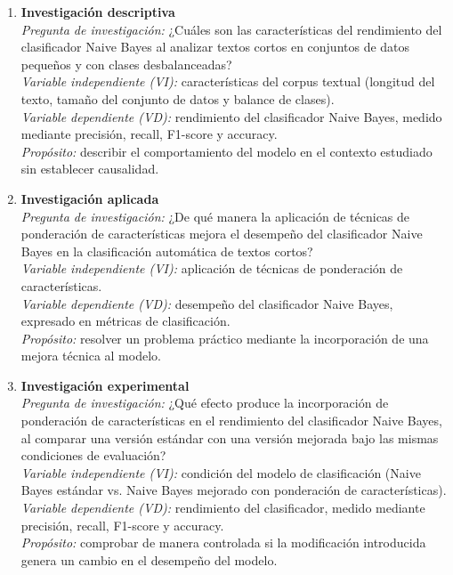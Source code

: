 \documentclass[11pt,a4paper]{article}
\begin{document}
\begin{enumerate}[leftmargin=1.2cm,itemsep=0.7em]
  \item \textbf{Investigación descriptiva}\\
  \textit{Pregunta de investigación:} ¿Cuáles son las características del rendimiento del clasificador Naive Bayes al analizar textos cortos en conjuntos de datos pequeños y con clases desbalanceadas?\\
  \textit{Variable independiente (VI):} características del corpus textual (longitud del texto, tamaño del conjunto de datos y balance de clases).\\
  \textit{Variable dependiente (VD):} rendimiento del clasificador Naive Bayes, medido mediante precisión, recall, F1-score y accuracy.\\
  \textit{Propósito:} describir el comportamiento del modelo en el contexto estudiado sin establecer causalidad.

  \item \textbf{Investigación aplicada}\\
  \textit{Pregunta de investigación:} ¿De qué manera la aplicación de técnicas de ponderación de características mejora el desempeño del clasificador Naive Bayes en la clasificación automática de textos cortos?\\
  \textit{Variable independiente (VI):} aplicación de técnicas de ponderación de características.\\
  \textit{Variable dependiente (VD):} desempeño del clasificador Naive Bayes, expresado en métricas de clasificación.\\
  \textit{Propósito:} resolver un problema práctico mediante la incorporación de una mejora técnica al modelo.

  \item \textbf{Investigación experimental}\\
  \textit{Pregunta de investigación:} ¿Qué efecto produce la incorporación de ponderación de características en el rendimiento del clasificador Naive Bayes, al comparar una versión estándar con una versión mejorada bajo las mismas condiciones de evaluación?\\
  \textit{Variable independiente (VI):} condición del modelo de clasificación (Naive Bayes estándar vs. Naive Bayes mejorado con ponderación de características).\\
  \textit{Variable dependiente (VD):} rendimiento del clasificador, medido mediante precisión, recall, F1-score y accuracy.\\
  \textit{Propósito:} comprobar de manera controlada si la modificación introducida genera un cambio en el desempeño del modelo.
\end{enumerate}
\end{document}
